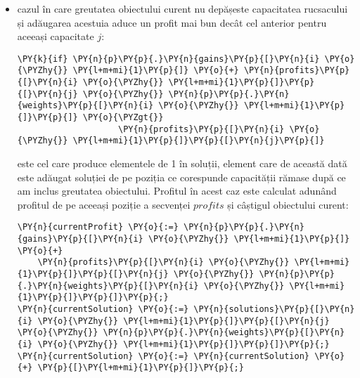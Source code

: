 \begin{sloppypar}
\begin{itemize}
        \begin{Verbatim}[commandchars=\\\{\}]
\PY{n}{currentProfit} \PY{o}{:=} \PY{n}{profits}\PY{p}{[}\PY{n}{i} \PY{o}{\PYZhy{}} \PY{l+m+mi}{1}\PY{p}{]}\PY{p}{[}\PY{n}{j}\PY{p}{]}\PY{p}{;}
\PY{n}{currentSolution} \PY{o}{:=} \PY{n}{solutions}\PY{p}{[}\PY{n}{i} \PY{o}{\PYZhy{}} \PY{l+m+mi}{1}\PY{p}{]}\PY{p}{[}\PY{n}{j}\PY{p}{]}\PY{p}{;}
\PY{n}{currentSolution} \PY{o}{:=} \PY{n}{currentSolution} \PY{o}{+} \PY{p}{[}\PY{l+m+mi}{0}\PY{p}{]}\PY{p}{;}
\end{Verbatim}
        este implementarea din metoda .
        \item cazul în care greutatea obiectului curent nu depășeste capacitatea rucsacului și adăugarea acestuia aduce un profit mai bun decât cel anterior pentru aceeași capacitate $j$:
        \begin{Verbatim}[commandchars=\\\{\}]
 \PY{k}{if} \PY{n}{p}\PY{p}{.}\PY{n}{gains}\PY{p}{[}\PY{n}{i} \PY{o}{\PYZhy{}} \PY{l+m+mi}{1}\PY{p}{]} \PY{o}{+} \PY{n}{profits}\PY{p}{[}\PY{n}{i} \PY{o}{\PYZhy{}} \PY{l+m+mi}{1}\PY{p}{]}\PY{p}{[}\PY{n}{j} \PY{o}{\PYZhy{}} \PY{n}{p}\PY{p}{.}\PY{n}{weights}\PY{p}{[}\PY{n}{i} \PY{o}{\PYZhy{}} \PY{l+m+mi}{1}\PY{p}{]}\PY{p}{]} \PY{o}{\PYZgt{}} 
                    \PY{n}{profits}\PY{p}{[}\PY{n}{i} \PY{o}{\PYZhy{}} \PY{l+m+mi}{1}\PY{p}{]}\PY{p}{[}\PY{n}{j}\PY{p}{]}
\end{Verbatim}
        este cel care produce elementele de 1 în soluții, element care de această dată este adăugat soluției de pe poziția ce corespunde capacității rămase după ce am inclus greutatea obiectului. Profitul în acest caz este calculat adunând profitul de pe aceeași poziție a secvenței $profits$ și câștigul obiectului curent:
        \begin{Verbatim}[commandchars=\\\{\}]
\PY{n}{currentProfit} \PY{o}{:=} \PY{n}{p}\PY{p}{.}\PY{n}{gains}\PY{p}{[}\PY{n}{i} \PY{o}{\PYZhy{}} \PY{l+m+mi}{1}\PY{p}{]} \PY{o}{+} 
    \PY{n}{profits}\PY{p}{[}\PY{n}{i} \PY{o}{\PYZhy{}} \PY{l+m+mi}{1}\PY{p}{]}\PY{p}{[}\PY{n}{j} \PY{o}{\PYZhy{}} \PY{n}{p}\PY{p}{.}\PY{n}{weights}\PY{p}{[}\PY{n}{i} \PY{o}{\PYZhy{}} \PY{l+m+mi}{1}\PY{p}{]}\PY{p}{]}\PY{p}{;}
\PY{n}{currentSolution} \PY{o}{:=} \PY{n}{solutions}\PY{p}{[}\PY{n}{i} \PY{o}{\PYZhy{}} \PY{l+m+mi}{1}\PY{p}{]}\PY{p}{[}\PY{n}{j} \PY{o}{\PYZhy{}} \PY{n}{p}\PY{p}{.}\PY{n}{weights}\PY{p}{[}\PY{n}{i} \PY{o}{\PYZhy{}} \PY{l+m+mi}{1}\PY{p}{]}\PY{p}{]}\PY{p}{;}
\PY{n}{currentSolution} \PY{o}{:=} \PY{n}{currentSolution} \PY{o}{+} \PY{p}{[}\PY{l+m+mi}{1}\PY{p}{]}\PY{p}{;}

\end{Verbatim}
\end{itemize}
\end{sloppypar}

